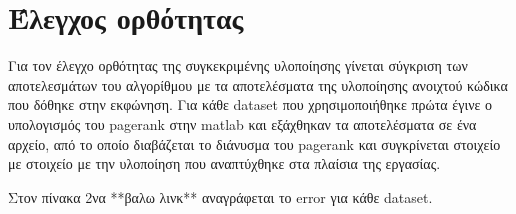 \documentclass[10p]{report}
\begin{document}
\section*{Έλεγχος ορθότητας}

Για τον έλεγχο ορθότητας της συγκεκριμένης υλοποίησης γίνεται σύγκριση των αποτελεσμάτων 
του αλγορίθμου με τα αποτελέσματα της υλοποίησης ανοιχτού κώδικα που δόθηκε στην εκφώνηση. Για 
κάθε dataset που χρησιμοποιήθηκε πρώτα έγινε ο υπολογισμός του pagerank στην 
matlab και εξάχθηκαν τα αποτελέσματα σε ένα αρχείο, από το οποίο διαβάζεται το 
διάνυσμα του pagerank και συγκρίνεται στοιχείο με στοιχείο με την υλοποίηση 
που αναπτύχθηκε στα πλαίσια της εργασίας. 

Στον πίνακα 2να **βαλω λινκ** αναγράφεται το error για κάθε dataset. 
\end{document}
